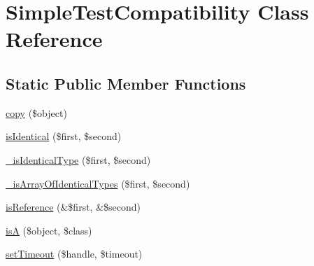\hypertarget{class_simple_test_compatibility}{
\section{SimpleTestCompatibility Class Reference}
\label{class_simple_test_compatibility}
}
\subsection*{Static Public Member Functions}
\begin{DoxyCompactItemize}
\item 
\hyperlink{class_simple_test_compatibility_afacf09456e0799679791c5de62288b5f}{copy} (\$object)
\item 
\hyperlink{class_simple_test_compatibility_a51ae07b91b8b9db204faca7c23795417}{isIdentical} (\$first, \$second)
\item 
\hyperlink{class_simple_test_compatibility_af12848db8e702fdc94ff39c09f57c226}{\_\-isIdenticalType} (\$first, \$second)
\item 
\hyperlink{class_simple_test_compatibility_aa6953a935c28d4f336281526758423a9}{\_\-isArrayOfIdenticalTypes} (\$first, \$second)
\item 
\hyperlink{class_simple_test_compatibility_a6c75c63b9011298640fbdbbece86626d}{isReference} (\&\$first, \&\$second)
\item 
\hyperlink{class_simple_test_compatibility_a4bb903a3687e510b0ccf712e99149965}{isA} (\$object, \$class)
\item 
\hyperlink{class_simple_test_compatibility_acbacab6c2b39122b60678e33c99d58aa}{setTimeout} (\$handle, \$timeout)
\end{DoxyCompactItemize}


